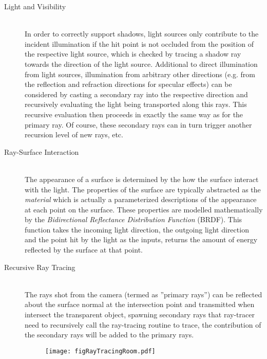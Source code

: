 \begin{description}
	\item[Light and Visibility] \hfill \\

		In order to correctly support shadows, light sources only contribute to the incident illumination if the hit point is not occluded from the position of the respective light source, which is checked by tracing a shadow ray towards the direction of the light source.
		Additional to direct illumination from light sources, illumination from arbitrary other directions (e.g. from the reflection and refraction directions for specular effects) can be considered by casting a secondary ray into the respective direction and recursively evaluating the light being transported along this rays. This recursive evaluation then proceeds in exactly the same way as for the primary ray. Of course, these secondary rays can in turn trigger another recursion level of new rays, etc.


	\item[Ray-Surface Interaction] \hfill \\
		The appearance of a surface is determined by the how the surface interact with the light. The properties of the surface are typically abstracted as the \textit{material} which is actually a parameterized descriptions of the appearance at each point on the surface. These properties are modelled mathematically by the \textit{Bidirectional Reflectance Distribution Function} (BRDF). This function takes the incoming light direction, the outgoing light direction and the point hit by the light as the inputs, returns the amount of energy reflected by the surface at that point. 

	\item[Recursive Ray Tracing] \hfill \\
		The rays shot from the camera (termed as ''primary rays'') can be reflected about the surface normal at the intersection point and transmitted when intersect the transparent object, spawning secondary rays that ray-tracer need to recursively call the ray-tracing routine to trace, the contribution of the secondary rays will be added to the primary rays. 

		\begin{figure}[htp] 
			\centering 
			\texttt{[image: figRayTracingRoom.pdf]} 
			\renewcommand{\thefigure}{\thechapter.\arabic{figure}}
			\caption[Recursive Ray Tracing]{}
			\label{fig:ray_tracing_room} 
		\end{figure}

\end{description} 

